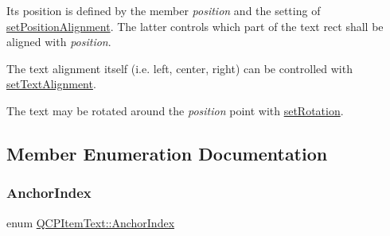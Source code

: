  Its position is defined by the member {\itshape position} and the setting of \mbox{\hyperlink{class_q_c_p_item_text_a781cdf8c640fc6a055dcff1e675c8c7a}{set\+Position\+Alignment}}. The latter controls which part of the text rect shall be aligned with {\itshape position}.

The text alignment itself (i.\+e. left, center, right) can be controlled with \mbox{\hyperlink{class_q_c_p_item_text_ab5bc0684c4d1bed81949a11b34dba478}{set\+Text\+Alignment}}.

The text may be rotated around the {\itshape position} point with \mbox{\hyperlink{class_q_c_p_item_text_a4bcc10cd97952c3f749d75824b5077f0}{set\+Rotation}}. 

\subsection{Member Enumeration Documentation}
\mbox{\label{class_q_c_p_item_text_a14a84e58f72519c8ae1d7a4a1dd23f21}} 
\subsubsection{\texorpdfstring{AnchorIndex}{AnchorIndex}}
{\footnotesize\ttfamily enum \mbox{\hyperlink{class_q_c_p_item_text_a14a84e58f72519c8ae1d7a4a1dd23f21}{Q\+C\+P\+Item\+Text\+::\+Anchor\+Index}}\hspace{0.3cm}{\ttfamily [protected]}}

